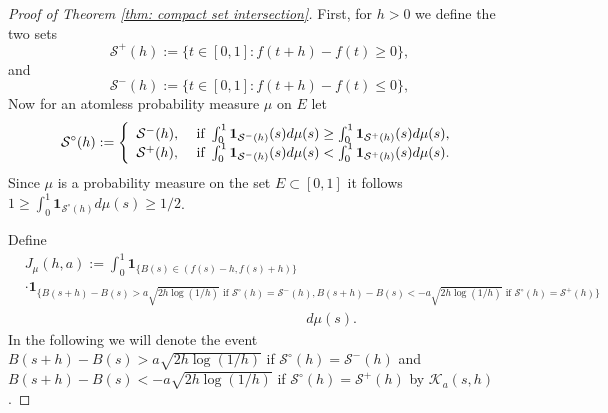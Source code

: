 \documentclass[11pt, reqno]{amsart}
\theoremstyle{plain}
\theoremstyle{definition}
\theoremstyle{remark}
\begin{document}
\begin{proof}[Proof of Theorem \ref{thm: compact set intersection}]
First, for $h>0$ we define the two sets
$$ {\mathcal{S}}^+(h) := \{ t\in[0,1] : f(t+h) -f(t) \geq 0 \},$$
and
$$ {\mathcal{S}}^-(h) := \{ t\in[0,1] : f(t+h) -f(t) \leq 0 \},$$
Now for an atomless probability measure $\mu$ on $E$ let
$$ {\mathcal{S}}^\circ (h) := \left\{\begin{array}{l l} {\mathcal{S}}^-(h),& \text{ if } \int_0^1 {\mathbf{1}}_{{\mathcal{S}}^-(h) }(s)d\mu (s) \geq \int_0^1 {\mathbf{1}}_{ {\mathcal{S}}^+(h)  }(s)d\mu (s) , \\ {\mathcal{S}}^+(h),& \text{ if } \int_0^1 {\mathbf{1}}_{  {\mathcal{S}}^-(h)  }(s)d\mu (s) < \int_0^1 {\mathbf{1}}_{  {\mathcal{S}}^+(h)  }(s)d\mu (s) . \end{array}\right.$$
Since $\mu$ is a probability measure on the set $E \subset [0,1]$ it follows $1 \geq \int_0^1 {\mathbf{1}}_{ {\mathcal{S}}^\circ (h)  }d\mu (s) \geq 1/2$.

Define
\begin{align*} &{J}_{\mu}(h,a) := \int_0^1 {\mathbf{1}}_{\{  B(s) \in (f(s)-h, f(s)+h) \}} \\ &\cdot {\mathbf{1}}_{\{ B (s+h) - B(s) > a\sqrt{2h\log(1/h)} \text{ if } {\mathcal{S}}^\circ (h)={{\mathcal{S}}^-(h)}, B (s+h) - B(s) < -a\sqrt{2h\log(1/h)} \text{ if } {\mathcal{S}}^\circ (h) = {{\mathcal{S}}^+(h)}\}} \\
&\ \ \ \ \ \ \ \  \ \ \ \ \ \ \ \ \ \ \ \ \ \ \ \ \ \ \  \ \ \ \ \ \ \ \ \ \ \ \ \ \ \ \ \ \ \  \ \ \ \ \ \ \ \ \ \ \ \ \ \ \ \ \ \ \  \ \ \ \ \ \ \ \  \ \ \ \ \ \ \ \ \ \ \ \ \ \ \  \ \ \  d\mu(s).
\end{align*}
In the following we will denote the event $B (s+h) - B(s) > a\sqrt{2h\log(1/h)}$ if ${\mathcal{S}}^\circ (h)={{\mathcal{S}}^-(h)}$ and $B (s+h) - B(s) < -a\sqrt{2h\log(1/h)}$ if ${\mathcal{S}}^\circ (h) = {{\mathcal{S}}^+(h)}$ by ${\mathcal{K}}_a (s,h)$.


\end{proof}
\end{document}
